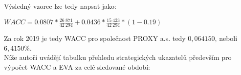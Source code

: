 Výsledný vzorec lze tedy napsat jako:


\begin{center}
$WACC = 0.0807 * \frac{26\ 871}{42\ 294} + 0.0436 * \frac{15\ 423}{42\ 294} * (1 - 0.19)$	
\end{center}

Za rok 2019 je tedy WACC pro společnost PROXY a.s. tedy $0,064150$, neboli $6,4150\%$.\\


Níže autoři uvádějí tabulku přehledu strategických ukazatelů především pro výpočet WACC a EVA za celé sledované období:\\

